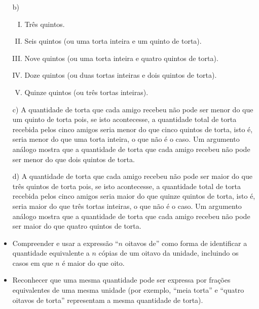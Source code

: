 \begin{multicols}{2}
\begin{solucao}{}{}
\begin{enumerate} [\quad a)]
    \item[b)]
\begin{enumerate}[I)]
          \item Três quintos.
          \item Seis quintos (ou uma torta inteira e um quinto de torta).
          \item Nove quintos (ou uma torta inteira e quatro quintos de torta).
          \item Doze quintos (ou duas tortas inteiras e dois quintos de torta).
          \item Quinze quintos (ou três tortas inteiras).
\end{enumerate}

    \item[c)]     A quantidade de torta que cada amigo recebeu não pode ser menor do que um quinto de torta pois, se isto acontecesse, a quantidade total de torta recebida pelos cinco amigos seria menor do que cinco quintos de torta, isto é, seria menor do que uma torta inteira, o que não é o caso. Um argumento análogo mostra que a quantidade de torta que cada amigo recebeu não pode ser menor do que dois quintos de torta.
    \item[d)]       A quantidade de torta que cada amigo recebeu não pode ser maior do que três quintos de torta pois, se isto acontecesse, a quantidade total de torta recebida pelos cinco amigos seria maior do que quinze quintos de torta, isto é, seria maior do que três tortas inteiras, o que não é o caso. Um argumento análogo mostra que a quantidade de torta que cada amigo recebeu não pode ser maior do que quatro quintos de torta.
\end{enumerate} %


\end{solucao}



\begin{objetivos}{}{}
\begin{itemize} %
\item Compreender e usar a expressão ``$n$ oitavos de'' como forma de identificar a quantidade equivalente a $n$ cópias de um oitavo da unidade, incluindo os casos em que $n$ é maior do que oito.
\item Reconhecer que uma mesma quantidade pode ser expressa por frações equivalentes de uma mesma unidade (por exemplo, ``meia torta'' e ``quatro oitavos de torta'' representam a mesma quantidade de torta).
\end{itemize} %
\end{objetivos}


\end{multicols}
